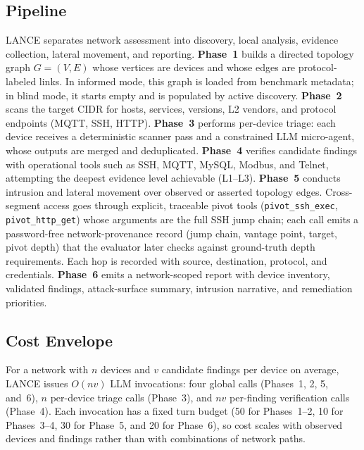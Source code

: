 \documentclass[conference,compsoc]{IEEEtran}
\newcommand{\harnessname}{\textsc{LANCE}\xspace}
\begin{document}
\subsection{Pipeline}
\label{sec:harness:pipeline}

\harnessname{} separates network assessment into discovery, local analysis, evidence collection, lateral movement, and reporting. \textbf{Phase~1} builds a directed topology graph $G=(V,E)$ whose vertices are devices and whose edges are protocol-labeled links. In informed mode, this graph is loaded from benchmark metadata; in blind mode, it starts empty and is populated by active discovery. \textbf{Phase~2} scans the target CIDR for hosts, services, versions, L2 vendors, and protocol endpoints (MQTT, SSH, HTTP). \textbf{Phase~3} performs per-device triage: each device receives a deterministic scanner pass and a constrained LLM micro-agent, whose outputs are merged and deduplicated. \textbf{Phase~4} verifies candidate findings with operational tools such as SSH, MQTT, MySQL, Modbus, and Telnet, attempting the deepest evidence level achievable (\textsf{L1}--\textsf{L3}). \textbf{Phase~5} conducts intrusion and lateral movement over observed or asserted topology edges. Cross-segment access goes through explicit, traceable pivot tools (\texttt{pivot\_ssh\_exec}, \texttt{pivot\_http\_get}) whose arguments are the full SSH jump chain; each call emits a password-free network-provenance record (jump chain, vantage point, target, pivot depth) that the evaluator later checks against ground-truth depth requirements. Each hop is recorded with source, destination, protocol, and credentials. \textbf{Phase~6} emits a network-scoped report with device inventory, validated findings, attack-surface summary, intrusion narrative, and remediation priorities.

\subsection{Cost Envelope}
\label{sec:harness:cost}

For a network with $n$ devices and $v$ candidate findings per device on average, \harnessname{} issues $O(nv)$ LLM invocations: four global calls (Phases~1, 2, 5, and~6), $n$ per-device triage calls (Phase~3), and $nv$ per-finding verification calls (Phase~4). Each invocation has a fixed turn budget (50 for Phases~1--2, 10 for Phases~3--4, 30 for Phase~5, and 20 for Phase~6), so cost scales with observed devices and findings rather than with combinations of network paths.
\end{document}
